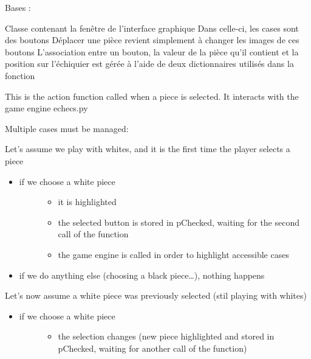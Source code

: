 \documentclass[letterpaper,10pt,french]{sphinxmanual}
\begin{document}
\begin{fulllineitems}
\label{\detokenize{autodoc:gui.Ui_Dialog}}
Bases : 

Classe contenant la fenêtre de l’interface graphique
Dans celle-ci, les cases sont des boutons
Déplacer une pièce revient simplement à changer les images de ces boutons
L’association entre un bouton, la valeur de la pièce qu’il contient et la position sur l’échiquier
est gérée à l’aide de deux dictionnaires utilisés dans la fonction

\begin{fulllineitems}
\label{\detokenize{autodoc:gui.Ui_Dialog.chk}}
This is the action function called when a piece is selected. It interacts
with the game engine echecs.py

Multiple cases must be managed:

Let’s assume we play with whites, and it is the first time the player selects
a piece
\begin{itemize}
\item {} \begin{description}
\item[{if we choose a white piece}] \leavevmode\begin{itemize}
\item {} 
it is highlighted

\item {} 
the selected button is stored in pChecked, waiting for the second call
of the function

\item {} 
the game engine is called in order to highlight accessible cases

\end{itemize}

\end{description}

\item {} 
if we do anything else (choosing a black piece…), nothing happens

\end{itemize}

Let’s now assume a white piece was previously selected (stil playing with whites)
\begin{itemize}
\item {} \begin{description}
\item[{if we choose a white piece}] \leavevmode\begin{itemize}
\item {} 
the selection changes (new piece highlighted and stored in pChecked,
waiting for another call of the function)


\end{itemize}
\end{description}
\end{itemize}
\end{fulllineitems}
\end{fulllineitems}
\end{document}
